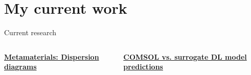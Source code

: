 \documentclass[10pt,aspectratio=169,dvipsnames]{beamer} %
\begin{document}
	\section{My current work}
	\begin{frame}{Current research}
		\begin{columns}[T]
			\begin{column}[t]{0.49\textwidth}
				\centering
				\textbf{\underline{Metamaterials: Dispersion diagrams}}
				\begin{figure}
					\centering
				\end{figure}
			\end{column}
			\begin{column}[t]{0.49\textwidth}
				\centering
				\textbf{\underline{COMSOL vs. surrogate DL model predictions}}
				\begin{figure}
					\centering
				\end{figure}			
			\end{column}		
		\end{columns}				
	\end{frame}	
	
\end{document}
